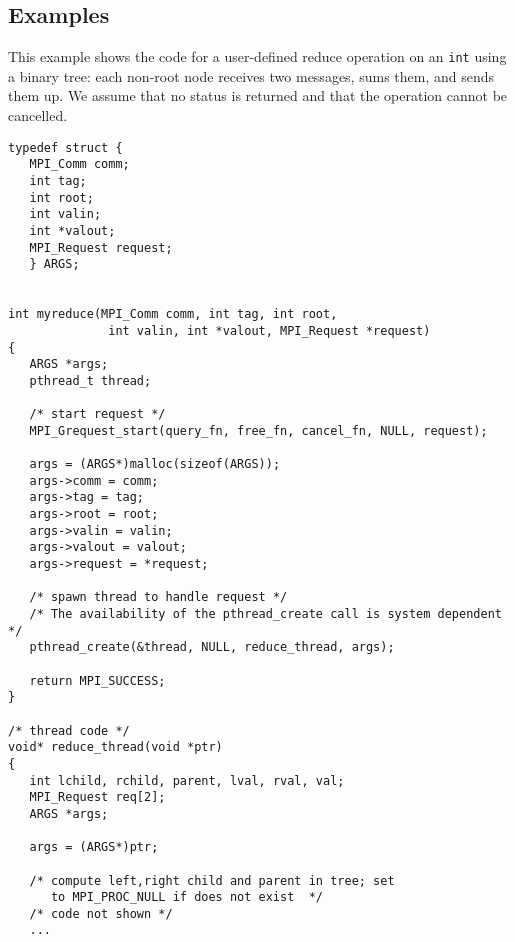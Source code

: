 \subsection{Examples}

\begin{example}{\rm
{}%
%
This example shows the code for a user-defined reduce operation on an
{\tt int} using
a binary tree: each non-root node receives two messages, sums them, 
and sends them up.  We assume that no status is returned and that the
operation cannot be cancelled.

\begin{verbatim}
typedef struct {
   MPI_Comm comm;
   int tag;
   int root;
   int valin;
   int *valout;
   MPI_Request request;
   } ARGS;


int myreduce(MPI_Comm comm, int tag, int root, 
              int valin, int *valout, MPI_Request *request)
{
   ARGS *args;
   pthread_t thread;
   
   /* start request */
   MPI_Grequest_start(query_fn, free_fn, cancel_fn, NULL, request);
   
   args = (ARGS*)malloc(sizeof(ARGS));
   args->comm = comm;
   args->tag = tag;
   args->root = root;
   args->valin = valin;
   args->valout = valout;
   args->request = *request;
   
   /* spawn thread to handle request */
   /* The availability of the pthread_create call is system dependent */
   pthread_create(&thread, NULL, reduce_thread, args);
   
   return MPI_SUCCESS;
}

/* thread code */
void* reduce_thread(void *ptr) 
{
   int lchild, rchild, parent, lval, rval, val;
   MPI_Request req[2];
   ARGS *args;
   
   args = (ARGS*)ptr;
   
   /* compute left,right child and parent in tree; set 
      to MPI_PROC_NULL if does not exist  */
   /* code not shown */
   ...
     

\end{verbatim}}
\end{example}
